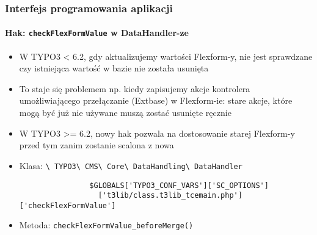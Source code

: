 
\begin{frame}[fragile]
	\frametitle{Interfejs programowania aplikacji}
	\framesubtitle{Hak: \texttt{checkFlexFormValue} w DataHandler-ze}

	\begin{itemize}
		\item W TYPO3 < 6.2, gdy aktualizujemy wartości Flexform-y, nie jest sprawdzane czy istniejąca wartość w bazie nie została usunięta
		\item To staje się problemem np. kiedy zapisujemy akcje kontrolera umożliwiającego przełączanie (Extbase) w Flexform-ie: stare akcje, które mogą być już nie używane muszą zostać usunięte ręcznie

		\item W TYPO3 >= 6.2, nowy hak pozwala na dostosowanie starej Flexform-y przed tym zanim zostanie scalona z nowa
		\item Klasa:\newline
			\smaller
				\texttt{\textbackslash
					TYPO3\textbackslash
					CMS\textbackslash
					Core\textbackslash
					DataHandling\textbackslash
					DataHandler}\normalsize

			\lstset{
				basicstyle=\smaller\ttfamily
			}

			\begin{lstlisting}
				$GLOBALS['TYPO3_CONF_VARS']['SC_OPTIONS']
				  ['t3lib/class.t3lib_tcemain.php']['checkFlexFormValue']
			\end{lstlisting}

		\item Metoda:\newline
			\smaller
				\texttt{checkFlexFormValue\_beforeMerge()}

	\end{itemize}

\end{frame}


